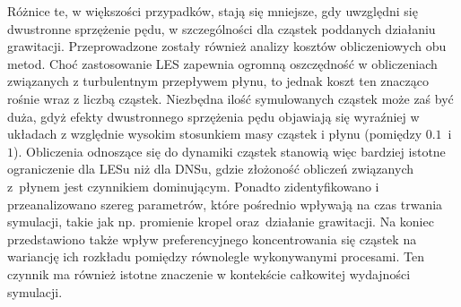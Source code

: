 \documentclass{pracamgren}
\begin{document}
{Różnice te, w większości przypadków, stają się mniejsze, gdy uwzględni się dwustronne sprzężenie pędu, w szczególności dla cząstek poddanych działaniu grawitacji.
\newline \indent
Przeprowadzone zostały również analizy kosztów obliczeniowych obu metod.
Choć zastosowanie LES zapewnia ogromną oszczędność w obliczeniach związanych z turbulentnym przepływem płynu, to jednak koszt ten znacząco rośnie wraz z liczbą cząstek.
Niezbędna ilość symulowanych cząstek może zaś być duża, gdyż efekty dwustronnego sprzężenia pędu objawiają się wyraźniej w układach z względnie wysokim stosunkiem masy cząstek i płynu (pomiędzy $0.1$~i~$1$).
Obliczenia odnoszące się do dynamiki cząstek stanowią więc bardziej istotne ograniczenie dla LESu niż dla DNSu, gdzie złożoność obliczeń związanych z~płynem jest czynnikiem dominującym.
Ponadto zidentyfikowano i przeanalizowano szereg parametrów, które pośrednio wpływają na czas trwania symulacji, takie jak np. promienie kropel oraz~działanie grawitacji.
Na koniec przedstawiono także wpływ preferencyjnego koncentrowania się cząstek na wariancję ich rozkładu pomiędzy równolegle wykonywanymi procesami.
Ten czynnik ma również istotne znaczenie w kontekście całkowitej wydajności symulacji.
}
\end{document}
